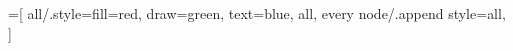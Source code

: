 =[%
    all/.style={fill=red,%
    draw=green,%
    text=blue},%
    all,%
    every node/.append style={all},%
]%